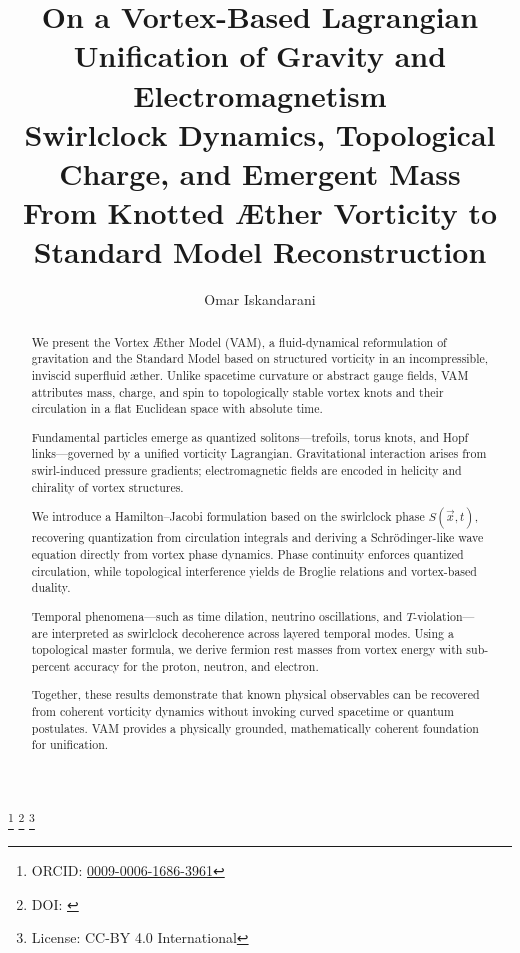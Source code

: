 \documentclass[preprint]{revtex4-2}
\begin{document}
        \begin{abstract}
            We present the Vortex \AE{}ther Model (VAM), a fluid-dynamical reformulation of gravitation and the Standard Model based on structured vorticity in an incompressible, inviscid superfluid æther. Unlike spacetime curvature or abstract gauge fields, VAM attributes mass, charge, and spin to topologically stable vortex knots and their circulation in a flat Euclidean space with absolute time.

            Fundamental particles emerge as quantized solitons—trefoils, torus knots, and Hopf links—governed by a unified vorticity Lagrangian. Gravitational interaction arises from swirl-induced pressure gradients; electromagnetic fields are encoded in helicity and chirality of vortex structures.

            We introduce a Hamilton–Jacobi formulation based on the swirlclock phase \( S(\vec{x}, t) \), recovering quantization from circulation integrals and deriving a Schrödinger-like wave equation directly from vortex phase dynamics. Phase continuity enforces quantized circulation, while topological interference yields de Broglie relations and vortex-based duality.

            Temporal phenomena—such as time dilation, neutrino oscillations, and $T$-violation—are interpreted as swirlclock decoherence across layered temporal modes. Using a topological master formula, we derive fermion rest masses from vortex energy with sub-percent accuracy for the proton, neutron, and electron.

            Together, these results demonstrate that known physical observables can be recovered from coherent vorticity dynamics without invoking curved spacetime or quantum postulates. VAM provides a physically grounded, mathematically coherent foundation for unification.
        \end{abstract}
\title{
    \textbf{On a Vortex-Based Lagrangian Unification of Gravity and Electromagnetism}\\[0.5em]
    \large Swirlclock Dynamics, Topological Charge, and Emergent Mass \\
    \normalsize From Knotted Æther Vorticity to Standard Model Reconstruction
}
\author{Omar Iskandarani}
\thanks{ORCID: \href{https://orcid.org/0009-0006-1686-3961}{0009-0006-1686-3961}}
\thanks{DOI: \href{https://doi.org/\paperdoi}{\paperdoi}}
\thanks{License: CC-BY 4.0 International}
\end{document}

